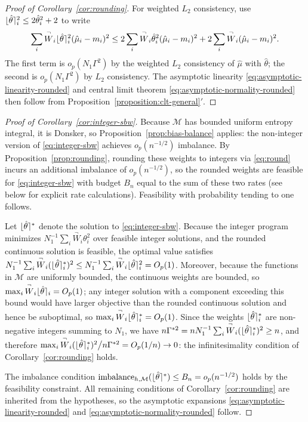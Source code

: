 \documentclass{article}
\theoremstyle{definition}
\DeclarePairedDelimiter\round{\lfloor}{\rceil}
\DeclareMathOperator{\imbalance}{imbalance}
\newcommand{\htheta}{\hat\theta}
\newcommand{\model}{\mathcal{M}}
\newcommand{\<}{\langle}
\renewcommand{\>}{\rangle}
\begin{document}
\begin{refsection}
\begin{proof}[Proof of Corollary~\ref{cor:rounding}]
For weighted $L_2$ consistency, use $\round{\htheta}_i^2 \le 2\htheta_i^2 + 2$ to write
\[
\sum_i \overset{\neg}{W}_i \round{\htheta}_i^2 (\hat\mu_i - m_i)^2 \le 2\sum_i \overset{\neg}{W}_i \htheta_i^2 (\hat\mu_i - m_i)^2 + 2\sum_i \overset{\neg}{W}_i (\hat\mu_i - m_i)^2.
\]
The first term is $o_p(N_1 \Gamma^2)$ by the weighted $L_2$ consistency of $\hat\mu$ with $\htheta$; the second is $o_p(N_1\Gamma^2)$ by $L_2$ consistency. The asymptotic linearity \eqref{eq:asymptotic-linearity-rounded} and central limit theorem \eqref{eq:asymptotic-normality-rounded} then follow from Proposition~\ref{proposition:clt-general}$'$.
\end{proof}

\begin{proof}[Proof of Corollary~\ref{cor:integer-sbw}]
Because $\model$ has bounded uniform entropy integral, it is Donsker, so Proposition~\ref{prop:bias-balance} applies: the non-integer version of \eqref{eq:integer-sbw} achieves $o_p(n^{-1/2})$ imbalance.
By Proposition~\ref{prop:rounding}, rounding these weights to integers via \eqref{eq:round} incurs an additional imbalance of $o_p(n^{-1/2})$, so the rounded weights are feasible for \eqref{eq:integer-sbw} with budget $B_n$ equal to the sum of these two rates (see below for explicit rate calculations). Feasibility with probability tending to one follows.

Let $\round{\htheta}^*$ denote the solution to \eqref{eq:integer-sbw}. Because the integer program minimizes $N_1^{-1}\sum_i \overset{\neg}{W}_i \theta_i^2$ over feasible integer solutions, and the rounded continuous solution is feasible, the optimal value satisfies $N_1^{-1}\sum_i \overset{\neg}{W}_i (\round{\htheta}^*_i)^2 \le N_1^{-1}\sum_i \overset{\neg}{W}_i \round{\htheta}_i^2 = O_p(1)$. Moreover, because the functions in $\model$ are uniformly bounded, the continuous weights are bounded, so $\max_i \overset{\neg}{W}_i \round{\htheta}_i = O_p(1)$; any integer solution with a component exceeding this bound would have larger objective than the rounded continuous solution and hence be suboptimal, so $\max_i \overset{\neg}{W}_i \round{\htheta}^*_i = O_p(1)$. Since the weights $\round{\htheta}^*_i$ are non-negative integers summing to $N_1$, we have $n\Gamma^{*2} = n N_1^{-1}\sum_i \overset{\neg}{W}_i (\round{\htheta}^*_i)^2 \ge n$, and therefore $\max_i \overset{\neg}{W}_i (\round{\htheta}^*_i)^2 \big/ n\Gamma^{*2} = O_p(1/n) \to 0$: the infinitesimality condition of Corollary~\ref{cor:rounding} holds.

The imbalance condition $\imbalance_{h,\model}(\round{\htheta}^*) \le B_n = o_p(n^{-1/2})$ holds by the feasibility constraint. All remaining conditions of Corollary~\ref{cor:rounding} are inherited from the hypotheses, so the asymptotic expansions \eqref{eq:asymptotic-linearity-rounded} and \eqref{eq:asymptotic-normality-rounded} follow.
\end{proof}


\end{refsection}
\end{document}
